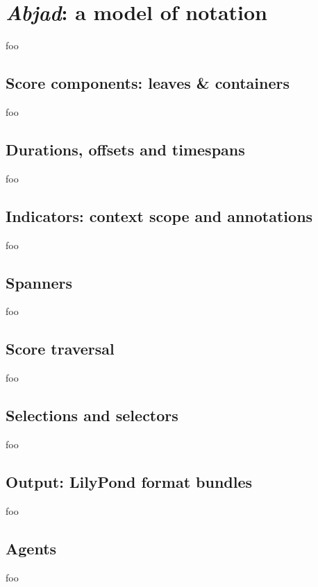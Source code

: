 \chapter{\emph{Abjad}: a model of notation}

foo

\section{Score components: leaves \& containers}

foo

\section{Durations, offsets and timespans}

foo

\section{Indicators: context scope and annotations}

foo

\section{Spanners}

foo

\section{Score traversal}

foo

\section{Selections and selectors}

foo

\section{Output: LilyPond format bundles}

foo

\section{Agents}

foo